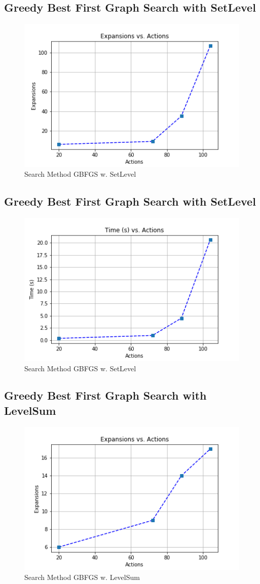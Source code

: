 \documentclass[a4paper]{article}
\begin{document}
\subsection{Greedy Best First Graph Search with SetLevel}

\begin{figure}[htpb]
\begin{center}
\includegraphics[width=0.5\columnwidth]{fig/results_034.png}
\caption{Search Method GBFGS w. SetLevel}
\end{center}
\label{fig034}
\end{figure}
        

\subsection{Greedy Best First Graph Search with SetLevel}

\begin{figure}[htpb]
\begin{center}
\includegraphics[width=0.5\columnwidth]{fig/results_031.png}
\caption{Search Method GBFGS w. SetLevel}
\end{center}
\label{fig031}
\end{figure}
        

\subsection{Greedy Best First Graph Search with LevelSum}

\begin{figure}[htpb]
\begin{center}
\includegraphics[width=0.5\columnwidth]{fig/results_134.png}
\caption{Search Method GBFGS w. LevelSum}
\end{center}
\label{fig134}
\end{figure}
        
\end{document}
